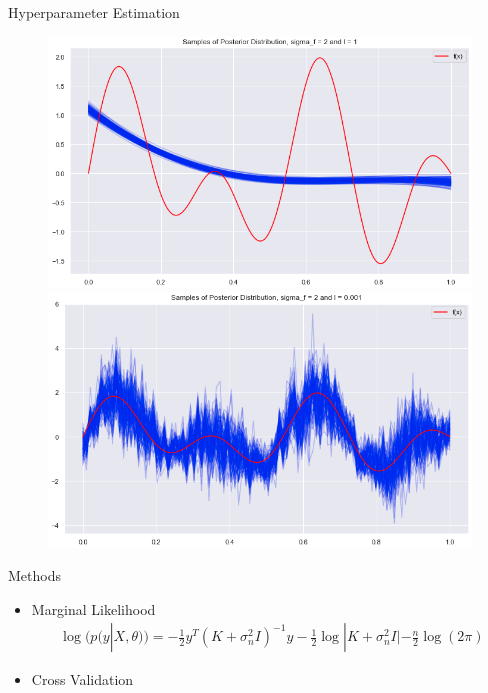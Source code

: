 \documentclass[10pt]{beamer}
\begin{document}
\begin{frame}{Hyperparameter Estimation}{\cite[Chapter 5]{RW05}}
\begin{center}
\begin{figure}
\includegraphics[scale=0.21]{images/hyp_posterior_1_example2}
\includegraphics[scale=0.21]{images/hyp_posterior_2_example2}
\end{figure}
\end{center}
\begin{block}{Methods}
\begin{itemize}
\item Marginal Likelihood
\begin{align*}
\log(p(y|X, \theta)) = -\frac{1}{2}y^T (K+\sigma_n^2I)^{-1}y - \frac{1}{2}\log|K+\sigma_n^2I| - \frac{n}{2}\log (2\pi)
\end{align*}
\item Cross Validation
\end{itemize}
\end{block}
\end{frame}
\end{document}
